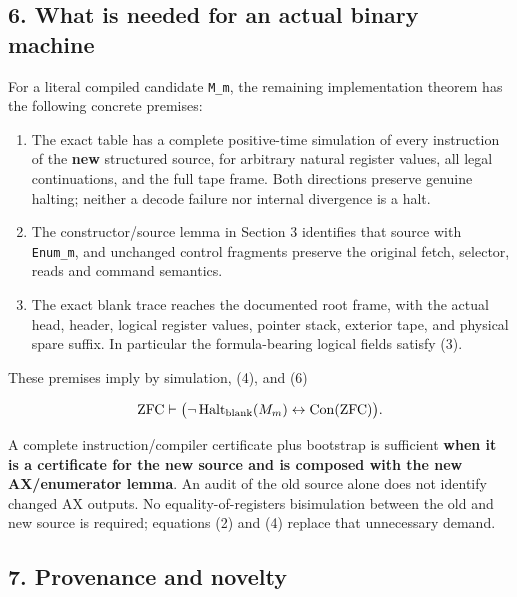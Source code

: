 \hypertarget{what-is-needed-for-an-actual-binary-machine}{%
\subsection{6. What is needed for an actual binary
machine}\label{what-is-needed-for-an-actual-binary-machine}}

For a literal compiled candidate \texttt{M\_m}, the remaining
implementation theorem has the following concrete premises:

\begin{enumerate}
\def\labelenumi{\arabic{enumi}.}
\tightlist
\item
  The exact table has a complete positive-time simulation of every
  instruction of the \textbf{new} structured source, for arbitrary
  natural register values, all legal continuations, and the full tape
  frame. Both directions preserve genuine halting; neither a decode
  failure nor internal divergence is a halt.
\item
  The constructor/source lemma in Section 3 identifies that source with
  \texttt{Enum\_m}, and unchanged control fragments preserve the
  original fetch, selector, reads and command semantics.
\item
  The exact blank trace reaches the documented root frame, with the
  actual head, header, logical register values, pointer stack, exterior
  tape, and physical spare suffix. In particular the formula-bearing
  logical fields satisfy (3).
\end{enumerate}

These premises imply by simulation, (4), and (6)

\[
\mathrm{ZFC}\vdash
\bigl(\neg\operatorname{Halt}_{\rm blank}(M_m)
\leftrightarrow\operatorname{Con}(\mathrm{ZFC})\bigr).
\]

A complete instruction/compiler certificate plus bootstrap is sufficient
\textbf{when it is a certificate for the new source and is composed with
the new AX/enumerator lemma}. An audit of the old source alone does not
identify changed AX outputs. No equality-of-registers bisimulation
between the old and new source is required; equations (2) and (4)
replace that unnecessary demand.

\hypertarget{provenance-and-novelty}{%
\subsection{7. Provenance and novelty}\label{provenance-and-novelty}}

